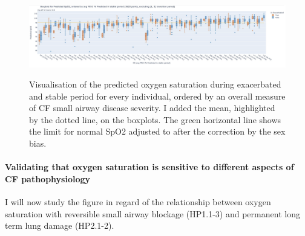 \begin{figure}[!h]
    \caption{Visualisation of the predicted oxygen saturation during exacerbated and stable period for every individual, ordered by an overall measure of CF small airway disease severity. I added the mean, highlighted by the dotted line, on the boxplots. The green horizontal line shows the limit for normal SpO2 adjusted to after the correction by the sex bias.}
    \centering
    \includegraphics[width=150mm]{Chapter1/Figs/o2sat_boxplots_smartcare.png}
    \label{fig:o2sat_boxplots_smartcare}
\end{figure}

\paragraph{Validating that oxygen saturation is sensitive to different aspects of CF pathophysiology}
I will now study the figure in regard of the relationship between oxygen saturation with reversible small airway blockage (HP1.1-3) and permanent long term lung damage (HP2.1-2).

